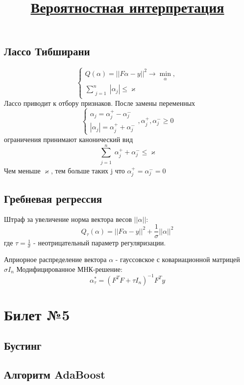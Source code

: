 \documentclass[a4paper]{article}
\theoremstyle{plain}
\theoremstyle{remark}
\theoremstyle{definition}
\renewcommand{\leq}{\leqslant}
\renewcommand{\geq}{\geqslant}
\newcommand{\bigtitle}[1]{\title{\textbf{\underline{#1}}}}
\begin{document}
\subsection{Лассо Тибширани}
$$
\begin{cases}
	Q(\alpha) = ||F\alpha - y||^2 \rightarrow \min_{\substack{\alpha}}, \\
	\sum_{\substack{j=1}}^n|\alpha_j| \leq \varkappa
\end{cases}
$$
Лассо приводит к отбору признаков. После замены переменных
$$ \begin{cases}
	\alpha_j = \alpha_j^+ - \alpha_j^- \\
	|\alpha_j| = \alpha_j^+ + \alpha_j^- 
\end{cases}, \alpha_j^+, \alpha_j^- \geq 0 $$
ограничения принимают канонический вид $$ \sum_{\substack{j=1}}^n \alpha_j^+ + \alpha_j^- \leq \varkappa $$
Чем меньше $\varkappa$, тем больше таких j что $\alpha_j^+ = \alpha_j^- =0$

\subsection{Гребневая регрессия}
Штраф за увеличение норма вектора весов $||\alpha||$:
$$ Q_\tau(\alpha) = ||F\alpha - y||^2 + \frac{1}{\sigma} ||\alpha||^2$$
где $\tau = \frac{1}{\sigma}$ - неотрицательный параметр регуляризации.
\bigtitle{Вероятностная интерпретация}
Априорное распределение вектора $\alpha$ - гауссовское с ковариационной матрицей $\sigma I_n$
Модифицированное МНК-решение: $$ \alpha_\tau^* = (F^{T}F + \tau I_n)^{-1}F^{T}y $$


\section{Билет №5}
\subsection{Бустинг}
\subsection{Алгоритм AdaBoost}
\end{document}
